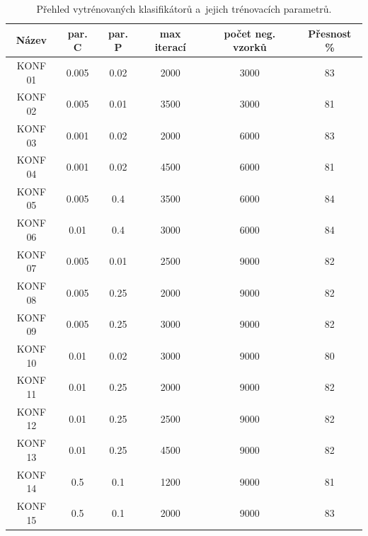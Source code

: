\begin{table}[H]
\centering
\caption{Přehled vytrénovaných klasifikátorů a~jejich trénovacích parametrů.}
\begin{tabular} { |c|c|c|c|c|c| }
\hline
{Název}        & {par. C}     & {par. P}      & {max iterací} & {počet neg. vzorků} & {Přesnost \%}  \\ \hline
KONF 01		& 	0.005	& 	  0.02	 &   2000   	  &		  3000   	    &        83	 \\ \hline
KONF 02		& 	0.005	& 	  0.01	 &   3500   	  &		  3000   	    &        81	 \\ \hline
KONF 03		& 	0.001	& 	  0.02	 &   2000   	  &		  6000   	    &        83	 \\ \hline
KONF 04		& 	0.001	& 	  0.02	 &   4500   	  &		  6000   	    &        81	 \\ \hline
KONF 05		& 	0.005	& 	  0.4 	 &   3500   	  &		  6000   	    &        84	 \\ \hline
KONF 06		& 	0.01 	& 	  0.4 	 &   3000   	  &		  6000   	    &        84	 \\ \hline
KONF 07		& 	0.005	& 	  0.01	 &   2500   	  &		  9000   	    &        82	 \\ \hline
KONF 08		& 	0.005	& 	  0.25	 &   2000   	  &		  9000   	    &        82	 \\ \hline
KONF 09		& 	0.005	& 	  0.25	 &   3000   	  &		  9000   	    &        82	 \\ \hline
KONF 10 	     & 	0.01 	& 	  0.02	 &   3000   	  &		  9000   	    &        80	 \\ \hline
KONF 11 	     & 	0.01 	& 	  0.25	 &   2000   	  &		  9000   	    &        82	 \\ \hline
KONF 12 	     & 	0.01 	& 	  0.25	 &   2500   	  &		  9000   	    &        82	 \\ \hline
KONF 13 	     & 	0.01 	& 	  0.25	 &   4500   	  &		  9000   	    &        82	 \\ \hline
KONF 14 	     & 	0.5	 	& 	  0.1	 &   1200   	  &		  9000   	    &        81	 \\ \hline
KONF 15 	     & 	0.5		& 	  0.1	 &   2000   	  &		  9000   	    &        83	 \\ \hline
\end{tabular}
\label{classTab1}
\end{table}

